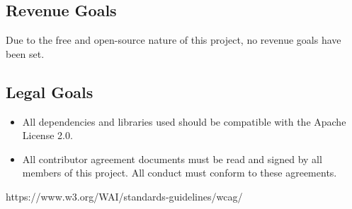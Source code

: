 \documentclass[11pt,english]{article}
\begin{document}
\subsection{Revenue Goals}
Due to the free and open-source nature of this project, no revenue goals have been set.

\subsection{Legal Goals}
\begin{itemize}
\item All dependencies and libraries used should be compatible with the Apache License 2.0.
\item All contributor agreement documents must be read and signed by all members of this project. All conduct must conform to these agreements.
\end{itemize}


https://www.w3.org/WAI/standards-guidelines/wcag/
\end{document}
